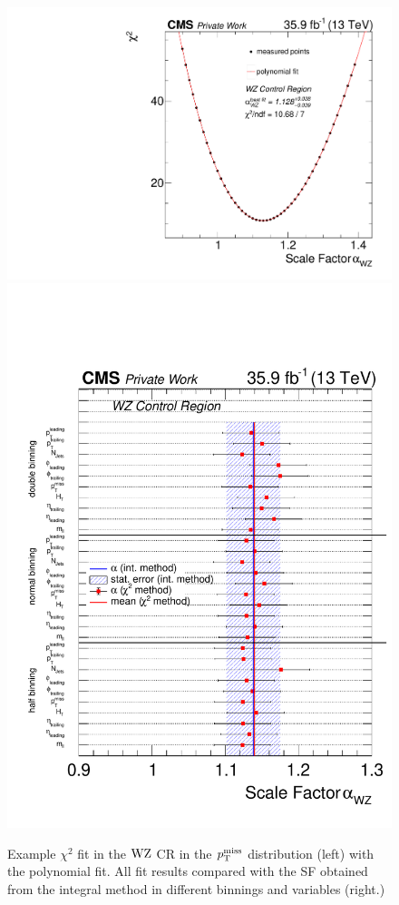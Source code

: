 \begin{figure}[tbp]
 \centering
 \includegraphics[width=\pairwidth]{figures/plots_CR/chi/WZ_met}
 \includegraphics[width=\pairwidth]{figures/plots_CR/chi/WZ_Compare}
 \caption{Example $\chi^2$ fit in the $\mathrm{W}\mathrm{Z}$ CR in the $p_{\mathrm{T}}^\text{miss}$ distribution (left) with the polynomial fit. All fit results compared with the SF obtained from the integral method in different binnings and variables (right.)}
 \label{fig:chiWZ}
\end{figure}




